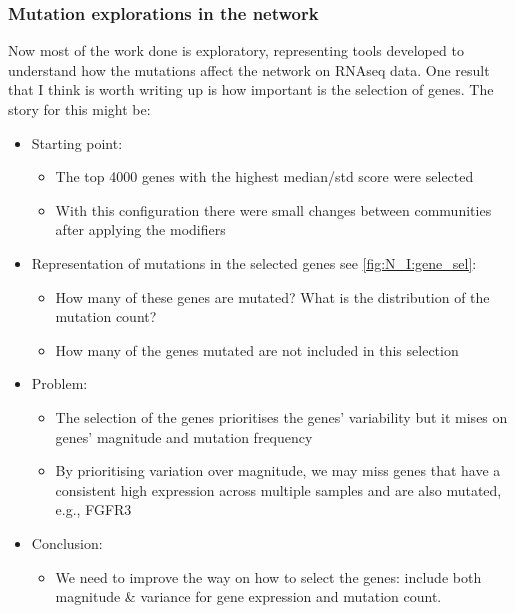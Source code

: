 \subsubsection{Mutation explorations in the network} \label{Sec:N_I:gene_sel}

Now most of the work done is exploratory, representing tools developed to understand how the mutations affect the network on RNAseq data. One result that I think is worth writing up is how important is the selection of genes. The story for this might be:
\begin{itemize}
    \item Starting point:
          \begin{itemize}
              \item The top 4000 genes with the highest median/std score were selected
              \item With this configuration there were small changes between communities after applying the modifiers
          \end{itemize}
    \item Representation of mutations in the selected genes see \ref*{fig:N_I:gene_sel}:
          \begin{itemize}
              \item How many of these genes are mutated? What is the distribution of the mutation count?
              \item How many of the genes mutated are not included in this selection
          \end{itemize}
    \item Problem:
          \begin{itemize}
              \item The selection of the genes prioritises the genes' variability but it mises on genes' magnitude and mutation frequency
              \item By prioritising variation over magnitude, we may miss genes that have a consistent high expression across multiple samples and are also mutated, e.g., FGFR3
          \end{itemize}
    \item Conclusion:
          \begin{itemize}
              \item We need to improve the way on how to select the genes: include both magnitude \& variance for gene expression and mutation count.
          \end{itemize}
\end{itemize}

